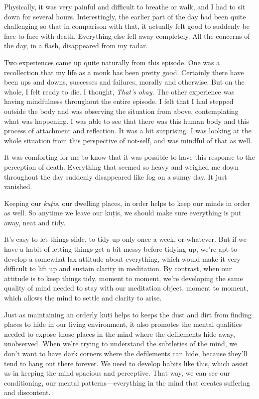 Physically, it was very painful and difficult to breathe or walk, and I 
had to sit down for several hours. Interestingly, the earlier part of 
the day had been quite challenging so that in comparison with that, it 
actually felt good to suddenly be face-to-face with death. Everything 
else fell away completely. All the concerns of the day, in a flash, 
disappeared from my radar.

Two experiences came up quite naturally from this episode. One was a 
recollection that my life as a monk has been pretty good. Certainly 
there have been ups and downs, successes and failures, morally and 
otherwise. But on the whole, I felt ready to die. I thought, 
\emph{That's okay.} The other experience was having mindfulness 
throughout the entire episode. I felt that I had stepped outside the 
body and was observing the situation from above, contemplating what was 
happening. I was able to see that there was this human body and this 
process of attachment and reflection. It was a bit surprising. I was 
looking at the whole situation from this perspective of not-self, and 
was mindful of that as well.

It was comforting for me to know that it was possible to have this 
response to the perception of death. Everything that seemed so heavy 
and weighed me down throughout the day suddenly disappeared like fog on 
a sunny day. It just vanished.


Keeping our \emph{kuṭis}, our dwelling places, in order helps to keep 
our minds in order as well. So anytime we leave our kuṭis, we should 
make sure everything is put away, neat and tidy.

It's easy to let things slide, to tidy up only once a week, or 
whatever. But if we have a habit of letting things get a bit messy 
before tidying up, we're apt to develop a somewhat lax attitude about 
everything, which would make it very difficult to lift up and sustain 
clarity in meditation. By contrast, when our attitude is to keep things 
tidy, moment to moment, we're developing the same quality of mind 
needed to stay with our meditation object, moment to moment, which 
allows the mind to settle and clarity to arise.

Just as maintaining an orderly kuṭi helps to keeps the dust and dirt 
from finding places to hide in our living environment, it also promotes 
the mental qualities needed to expose those places in the mind where 
the defilements hide away, unobserved. When we're trying to understand 
the subtleties of the mind, we don't want to have dark corners where 
the defilements can hide, because they'll tend to hang out there 
forever. We need to develop habits like this, which assist us in 
keeping the mind spacious and perceptive. That way, we can see our 
conditioning, our mental patterns---everything in the mind that creates 
suffering and discontent.

